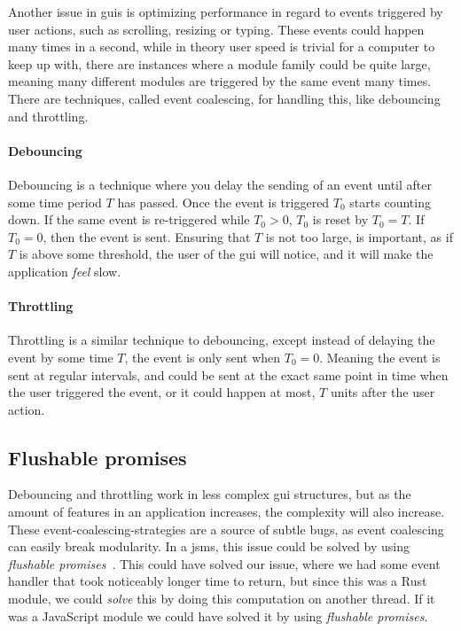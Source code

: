 Another issue in \gls*{gui}s is optimizing performance in regard to events
triggered by user actions, such as scrolling, resizing or typing. These events
could happen many times in a second, while in theory user speed is trivial for a
computer to keep up with, there are instances where a module family could be
quite large, meaning many different modules are triggered by the same event many
times. There are techniques, called event coalescing, for handling this, like
debouncing and throttling.

\paragraph{Debouncing} Debouncing is a technique where you delay the sending of
an event until after some time period $T$ has passed. Once the event is triggered
$T_0$ starts counting down. If the same event is re-triggered while $T_0 > 0$,
$T_0$ is reset by $T_0 = T$. If $T_0 = 0$, then the event is sent. Ensuring that
$T$ is not too large, is important, as if $T$ is above some threshold, the user
of the \gls*{gui} will notice, and it will make the application \textit{feel}
slow.

\paragraph{Throttling} Throttling is a similar technique to debouncing, except
instead of delaying the event by some time $T$, the event is only sent when
$T_0 = 0$. Meaning the event is sent at regular intervals, and could be sent at
the exact same point in time when the user triggered the event, or it could
happen at most, $T$ units after the user action.


\subsection{Flushable promises}

Debouncing and throttling work in less complex \gls*{gui} structures, but as the
amount of features in an application increases, the complexity will also
increase. These event-coalescing-strategies are a source of subtle bugs, as
event coalescing can easily break modularity. In a \gls*{jsms}, this issue could
be solved by using \textit{flushable promises}~\cite{flush}. This could have
solved our issue, where we had some event handler that took noticeably longer
time to return, but since this was a Rust module, we could \textit{solve} this
by doing this computation on another thread. If it was a JavaScript module we
could have solved it by using \textit{flushable promises}.

